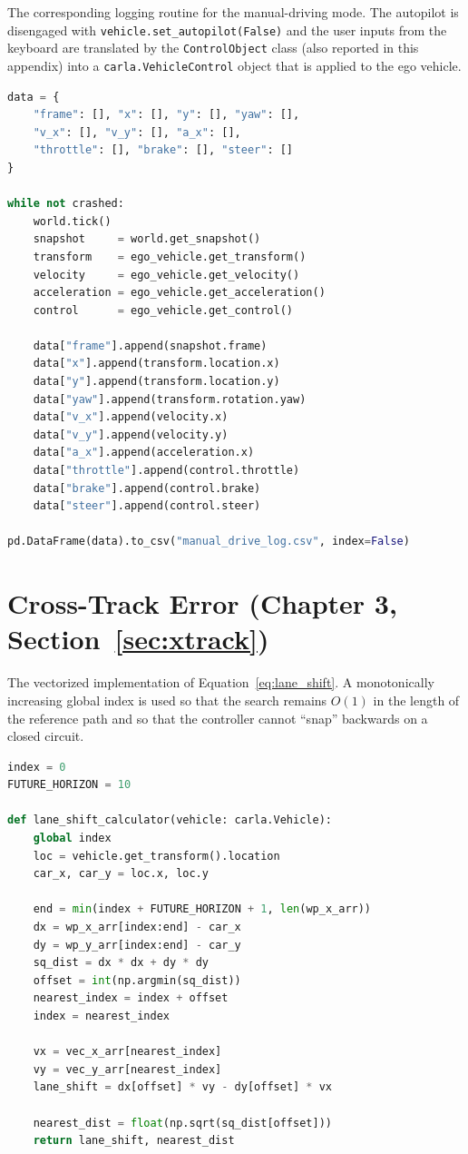The corresponding logging routine for the manual-driving mode. The autopilot is disengaged with \texttt{vehicle.set\_autopilot(False)} and the user inputs from the keyboard are translated by the \texttt{ControlObject} class (also reported in this appendix) into a \texttt{carla.VehicleControl} object that is applied to the ego vehicle.

\begin{lstlisting}[language=Python]
data = {
    "frame": [], "x": [], "y": [], "yaw": [],
    "v_x": [], "v_y": [], "a_x": [],
    "throttle": [], "brake": [], "steer": []
}

while not crashed:
    world.tick()
    snapshot     = world.get_snapshot()
    transform    = ego_vehicle.get_transform()
    velocity     = ego_vehicle.get_velocity()
    acceleration = ego_vehicle.get_acceleration()
    control      = ego_vehicle.get_control()

    data["frame"].append(snapshot.frame)
    data["x"].append(transform.location.x)
    data["y"].append(transform.location.y)
    data["yaw"].append(transform.rotation.yaw)
    data["v_x"].append(velocity.x)
    data["v_y"].append(velocity.y)
    data["a_x"].append(acceleration.x)
    data["throttle"].append(control.throttle)
    data["brake"].append(control.brake)
    data["steer"].append(control.steer)

pd.DataFrame(data).to_csv("manual_drive_log.csv", index=False)
\end{lstlisting}

\section{Cross-Track Error (Chapter 3, Section~\ref{sec:xtrack})}
The vectorized implementation of Equation~\eqref{eq:lane_shift}. A monotonically increasing global index is used so that the search remains $O(1)$ in the length of the reference path and so that the controller cannot \enquote{snap} backwards on a closed circuit.

\begin{lstlisting}[language=Python]
index = 0
FUTURE_HORIZON = 10

def lane_shift_calculator(vehicle: carla.Vehicle):
    global index
    loc = vehicle.get_transform().location
    car_x, car_y = loc.x, loc.y

    end = min(index + FUTURE_HORIZON + 1, len(wp_x_arr))
    dx = wp_x_arr[index:end] - car_x
    dy = wp_y_arr[index:end] - car_y
    sq_dist = dx * dx + dy * dy
    offset = int(np.argmin(sq_dist))
    nearest_index = index + offset
    index = nearest_index

    vx = vec_x_arr[nearest_index]
    vy = vec_y_arr[nearest_index]
    lane_shift = dx[offset] * vy - dy[offset] * vx

    nearest_dist = float(np.sqrt(sq_dist[offset]))
    return lane_shift, nearest_dist
\end{lstlisting}

